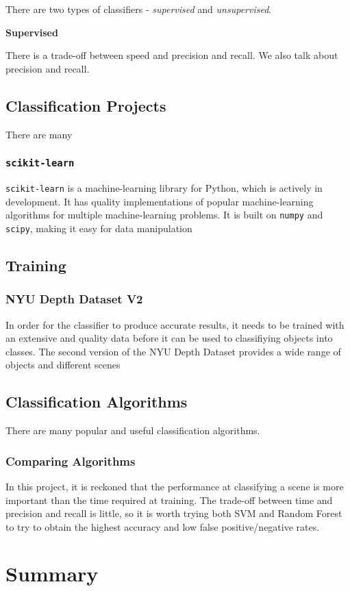 \documentclass[11pt,openright,a4paper]{report}
\begin{document}
There are two types of classifiers - \textit{supervised} and \textit{unsupervised}.

\textbf{Supervised}


There is a trade-off between speed and precision and recall. We also talk about precision and recall.


\section{Classification Projects}
There are many  

\subsection{\texttt{scikit-learn}}
\texttt{scikit-learn} is a machine-learning library for Python, which is actively in development. It has quality implementations of popular machine-learning algorithms for multiple machine-learning problems. It is built on \texttt{numpy} and \texttt{scipy}, making it easy for data manipulation \cite{scikit-learn-paper} 

\section{Training}

\subsection{NYU Depth Dataset V2 \cite{nyu-dataset}}
In order for the classifier to produce accurate results, it needs to be trained with an extensive and quality data before it can be used to classifiying objects into classes. The second version of the NYU Depth Dataset provides a wide range of objects and different scenes
\newpage

\section{Classification Algorithms}
There are many popular and useful classification algorithms. 

\subsection{Comparing Algorithms}

In this project, it is reckoned that the performance at classifying a scene is more important than the time required at training. The trade-off between time and precision and recall is little, so it is worth trying both SVM and Random Forest to try to obtain the highest accuracy and low false positive/negative rates.




\chapter{Summary}
\newpage




\end{document}
